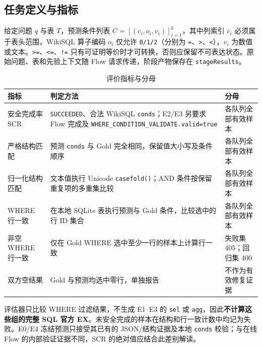 \documentclass[conference]{IEEEtran}
\begin{document}
\subsection{任务定义与指标}
给定问题 $q$ 与表 $T$，预测条件列表 $C=[(c_i,o_i,v_i)]_{i=1}^k$，其中列索引 $c_i$ 必须属于表头范围，WikiSQL 算子编码 $o_i$ 仅允许 \texttt{0/\allowbreak{}1/\allowbreak{}2}（分别为 \texttt{=}、\texttt{\textgreater{}}、\texttt{\textless{}}），$v_i$ 为数值或文本。\texttt{\textgreater{}=}、\texttt{\textless{}=}、\texttt{!=} 只有可证明等价时才可转换，否则应保留不可表达状态。原始问题、表和先验上下文随 Flow 请求传递，阶段产物保存在 \texttt{stageResults}。
\begin{table}[t]
\centering
\scriptsize
\caption{评价指标与分母}
\label{tab:t2}
\begin{tabular}{@{}>{\raggedright\arraybackslash}p{2.68cm}>{\raggedright\arraybackslash}p{11.17cm}>{\raggedright\arraybackslash}p{3.34cm}@{}}
\toprule
指标 & 判定方法 & 分母 \\
\midrule
安全完成率 SCR & \texttt{SUCCEEDED}、合法 WikiSQL \texttt{conds}；E2/E3 另要求 Flow 完成及 \texttt{WHERE\_CONDITION\_VALIDATE.valid=true} & 各队列全部有效样本 \\
严格结构匹配 & 预测 \texttt{conds} 与 Gold 完全相同，保留值大小写及条件顺序 & 各队列全部有效样本 \\
归一化结构匹配 & 文本值执行 Unicode \texttt{casefold()}；AND 条件按保留重复项的多重集比较 & 各队列全部有效样本 \\
WHERE 行一致 & 在本地 SQLite 表执行预测与 Gold 条件，比较选中的行 ID 集合 & 各队列全部有效样本 \\
非空 WHERE 行一致 & 仅在 Gold WHERE 选中至少一行的样本上计算行一致 & 失败集 405；回归集 400 \\
双方空结果 & Gold 与预测均选中零行，单独报告 & 不作为有效修复证据 \\
\bottomrule
\end{tabular}
\end{table}
评估器只比较 WHERE 过滤结果，不生成 E1–E3 的 \texttt{sel} 或 \texttt{agg}，因此\textbf{不计算这些组的完整 SQL 官方 EX}。未安全完成的样本在结构和行一致计数中均记为失败。E0/E4 冻结预测只接受其已有的 JSON/结构证据及本地 \texttt{conds} 校验；与在线 Flow 的内部验证证据不同，SCR 的绝对值应结合此差别解读。
\end{document}
